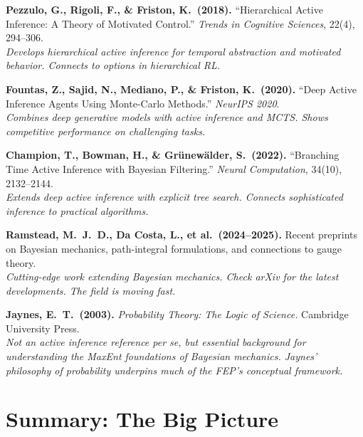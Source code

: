 \documentclass[11pt,a4paper]{article}
\theoremstyle{definition}
\begin{document}
\begin{enumerate}[leftmargin=2em, label={[\arabic*]}]
  \item \textbf{Pezzulo, G., Rigoli, F., \& Friston, K.\ (2018).}
    ``Hierarchical Active Inference: A Theory of Motivated Control.''
    \textit{Trends in Cognitive Sciences}, 22(4), 294--306.\\
    \textit{Develops hierarchical active inference for temporal abstraction and
    motivated behavior.  Connects to options in hierarchical RL.}

  \item \textbf{Fountas, Z., Sajid, N., Mediano, P., \& Friston, K.\ (2020).}
    ``Deep Active Inference Agents Using Monte-Carlo Methods.'' \textit{NeurIPS
    2020}.\\
    \textit{Combines deep generative models with active inference and MCTS.
    Shows competitive performance on challenging tasks.}

  \item \textbf{Champion, T., Bowman, H., \& Gr\"unew\"alder, S.\ (2022).}
    ``Branching Time Active Inference with Bayesian Filtering.'' \textit{Neural
    Computation}, 34(10), 2132--2144.\\
    \textit{Extends deep active inference with explicit tree search.  Connects
    sophisticated inference to practical algorithms.}

  \item \textbf{Ramstead, M.\ J.\ D., Da Costa, L., et al.\ (2024--2025).}
    Recent preprints on Bayesian mechanics, path-integral formulations, and
    connections to gauge theory.\\
    \textit{Cutting-edge work extending Bayesian mechanics.  Check arXiv for
    the latest developments.  The field is moving fast.}

  \item \textbf{Jaynes, E.\ T.\ (2003).} \textit{Probability Theory: The Logic
    of Science.} Cambridge University Press.\\
    \textit{Not an active inference reference per se, but essential background
    for understanding the MaxEnt foundations of Bayesian mechanics.  Jaynes'
    philosophy of probability underpins much of the FEP's conceptual framework.}

\end{enumerate}


\section*{Summary: The Big Picture}
\end{document}
